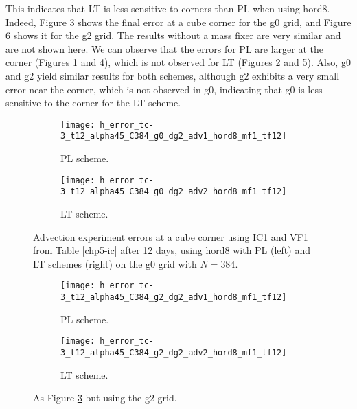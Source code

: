 \newpage
This indicates that LT is less sensitive to corners than PL when using hord8. 
Indeed, Figure \ref{chp-advcs-sec-exp-adv2-errors-0} shows the final error at a cube corner for the g0 grid, 
and Figure \ref{chp-advcs-sec-exp-adv2-errors-2} shows it for the g2 grid.
The results without a mass fixer are very similar and are not shown here. 
We can observe that the errors for PL are larger at the corner 
(Figures \ref{chp-advcs-sec-exp-adv2-errors-0a} and \ref{chp-advcs-sec-exp-adv2-errors-2a}), 
which is not observed for LT (Figures \ref{chp-advcs-sec-exp-adv2-errors-0b} and \ref{chp-advcs-sec-exp-adv2-errors-2b}).
Also, g0 and g2 yield similar results for both schemes, 
although g2 exhibits a very small error near the corner, which is not observed in g0, 
indicating that g0 is less sensitive to the corner for the LT scheme.
\begin{figure}[!htb]
	\centering
	\begin{subfigure}{0.45\textwidth}
		\centering
		\texttt{[image: h\_error\_tc-3\_t12\_alpha45\_C384\_g0\_dg2\_adv1\_hord8\_mf1\_tf12]}
		\caption{PL scheme.\label{chp-advcs-sec-exp-adv2-errors-0a}}
	\end{subfigure}
	\begin{subfigure}{0.45\textwidth}
		\centering
		\texttt{[image: h\_error\_tc-3\_t12\_alpha45\_C384\_g0\_dg2\_adv2\_hord8\_mf1\_tf12]}
		\caption{LT scheme.\label{chp-advcs-sec-exp-adv2-errors-0b}}
	\end{subfigure}
	\caption{
		Advection experiment errors at a cube corner using IC1 and VF1 from Table \ref{chp5-ic} after 12 days, using hord8
		with PL (left) and LT schemes (right) on the g0 grid with $N=384$. 
		\label{chp-advcs-sec-exp-adv2-errors-0}}
\end{figure}
\begin{figure}[!htb]
	\centering
	\begin{subfigure}{0.45\textwidth}
		\centering
		\texttt{[image: h\_error\_tc-3\_t12\_alpha45\_C384\_g2\_dg2\_adv1\_hord8\_mf1\_tf12]}
		\caption{PL scheme.\label{chp-advcs-sec-exp-adv2-errors-2a}}
	\end{subfigure}
	\begin{subfigure}{0.45\textwidth}
		\centering
		\texttt{[image: h\_error\_tc-3\_t12\_alpha45\_C384\_g2\_dg2\_adv2\_hord8\_mf1\_tf12]}
		\caption{LT scheme.\label{chp-advcs-sec-exp-adv2-errors-2b}}
	\end{subfigure}
	\caption{As Figure \ref{chp-advcs-sec-exp-adv2-errors-0} but using the g2 grid.\label{chp-advcs-sec-exp-adv2-errors-2}}
\end{figure}


